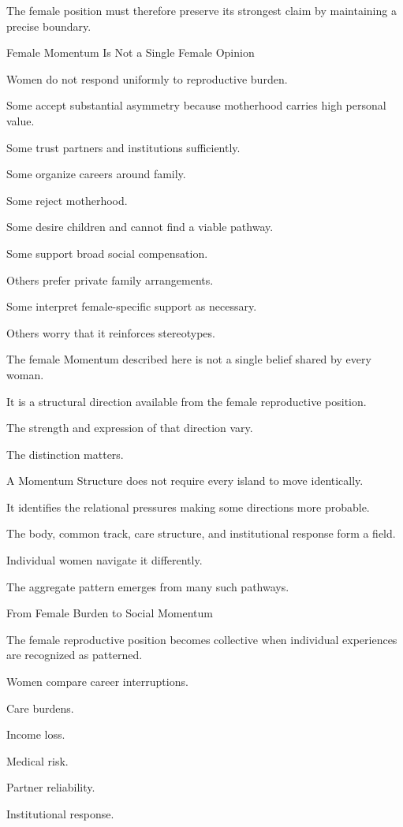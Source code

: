 The female position must therefore preserve its strongest claim by maintaining a precise boundary.

Female Momentum Is Not a Single Female Opinion

Women do not respond uniformly to reproductive burden.

Some accept substantial asymmetry because motherhood carries high personal value.

Some trust partners and institutions sufficiently.

Some organize careers around family.

Some reject motherhood.

Some desire children and cannot find a viable pathway.

Some support broad social compensation.

Others prefer private family arrangements.

Some interpret female-specific support as necessary.

Others worry that it reinforces stereotypes.

The female Momentum described here is not a single belief shared by every woman.

It is a structural direction available from the female reproductive position.

The strength and expression of that direction vary.

The distinction matters.

A Momentum Structure does not require every island to move identically.

It identifies the relational pressures making some directions more probable.

The body, common track, care structure, and institutional response form a field.

Individual women navigate it differently.

The aggregate pattern emerges from many such pathways.

From Female Burden to Social Momentum

The female reproductive position becomes collective when individual experiences are recognized as patterned.

Women compare career interruptions.

Care burdens.

Income loss.

Medical risk.

Partner reliability.

Institutional response.

